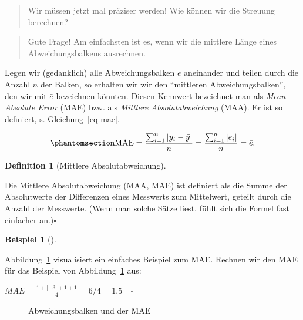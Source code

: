 \documentclass[
  a4paper,
]{scrbook}
\theoremstyle{definition}
\newtheorem{example}{Beispiel}[chapter]
\theoremstyle{definition}
\newtheorem{definition}{Definition}[chapter]
\theoremstyle{definition}
\theoremstyle{remark}
\begin{document}
\begin{quote}
{} Wir müssen jetzt mal präziser werden! Wie können wir
die Streuung berechnen?
\end{quote}

\begin{quote}
{} Gute Frage! Am einfachsten ist es, wenn wir die
mittlere Länge eines Abweichungsbalkens ausrechnen.
\end{quote}

Legen wir (gedanklich) alle Abweichungsbalken \(e\) aneinander und
teilen durch die Anzahl \(n\) der Balken, so erhalten wir wir den
``mittleren Abweichungsbalken'', den wir mit \(\bar{e}\) bezeichnen
könnten. Diesen Kennwert bezeichnet man als \emph{Mean Absolute Error}
(MAE) bzw. als \emph{Mittlere Absolutabweichung} (MAA). Er ist so
definiert, s. Gleichung~\ref{eq-mae}.

\begin{equation}\phantomsection\label{eq-mae}{{\displaystyle \mathrm {MAE} ={\frac {\sum _{i=1}^{n}\left|y_{i}-\bar{y}\right|}{n}}={\frac {\sum _{i=1}^{n}\left|e_{i}\right|}{n}}=\bar{e}.}}\end{equation}

\begin{definition}[Mittlere
Absolutabweichung]\protect\hypertarget{def-mae}{}\label{def-mae}

Die Mittlere Absolutabweichung (MAA, MAE) ist definiert als die Summe
der Absolutwerte der Differenzen eines Messwerts zum Mittelwert, geteilt
durch die Anzahl der Messwerte. (Wenn man solche Sätze liest, fühlt sich
die Formel fast einfacher an.)\(\square\)

\end{definition}

\begin{example}[]\protect\hypertarget{exm-mae}{}\label{exm-mae}

Abbildung~\ref{fig-mae} visualisiert ein einfaches Beispiel zum MAE.
Rechnen wir den MAE für das Beispiel von Abbildung~\ref{fig-mae} aus:

\(MAE = \frac{1 + |- 3| + 1 + 1}{4} = 6/4 = 1.5 \quad \square\)

\end{example}

\begin{figure}


\caption{\label{fig-mae}Abweichungsbalken und der MAE}

\end{figure}%
\end{document}

